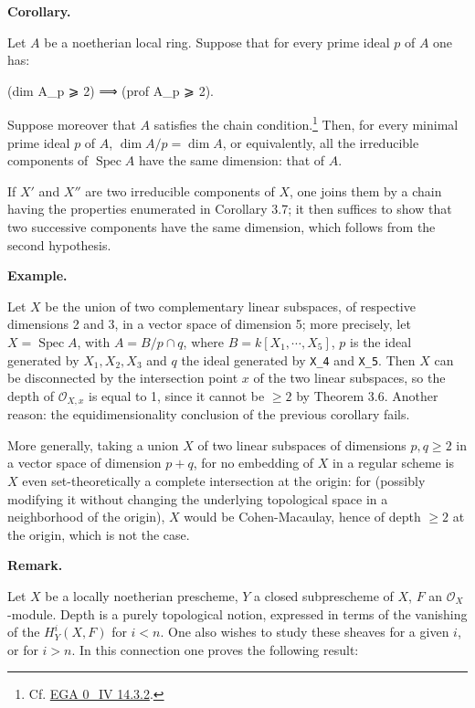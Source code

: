 \documentclass[
  11pt,
  a4paper,
]{book}
\newenvironment{Shaded}{}{}
\newcommand{\NormalTok}[1]{#1}
\begin{document}
\textbf{Corollary.}

Let \(A\) be a noetherian local ring. Suppose that for every prime ideal
\(p\) of \(A\) one has:

\begin{Shaded}
\begin{Highlighting}[]
\NormalTok{(dim A\_p ⩾ 2) ⟹ (prof A\_p ⩾ 2).}
\end{Highlighting}
\end{Shaded}

Suppose moreover that \(A\) satisfies the chain condition.\footnote{Cf.
  \href{https://jcreinhold.github.io/ega/iv/01-ch0-14-combinatorial-dimension.html\#143-the-chain-condition}{EGA
  0\_IV 14.3.2}.} Then, for every minimal prime ideal \(p\) of \(A\),
\(\dim
A/p = \dim A\), or equivalently, all the irreducible components of
\(\operatorname{Spec} A\) have the same dimension: that of \(A\).

If \(X'\) and \(X''\) are two irreducible components of \(X\), one joins
them by a chain having the properties enumerated in Corollary 3.7; it
then suffices to show that two successive components have the same
dimension, which follows from the second hypothesis.

\textbf{Example.}

Let \(X\) be the union of two complementary linear subspaces, of
respective dimensions 2 and 3, in a vector space of dimension 5; more
precisely, let \(X = \operatorname{Spec} A\), with \(A = B/p \cap q\),
where \(B = k[X_{1}, \cdots,
X_{5}]\), \(p\) is the ideal generated by \(X_{1}, X_{2}, X_{3}\) and
\(q\) the ideal generated by \texttt{X\_4} and \texttt{X\_5}. Then \(X\)
can be disconnected by the intersection point \(x\) of the two linear
subspaces, so the depth of \(\mathcal{O}_{X,x}\) is equal to 1, since it
cannot be \(\geqslant 2\) by Theorem 3.6. Another reason: the
equidimensionality conclusion of the previous corollary fails.

More generally, taking a union \(X\) of two linear subspaces of
dimensions \(p, q \geqslant 2\) in a vector space of dimension
\(p + q\), for no embedding of \(X\) in a regular scheme is \(X\) even
set-theoretically a complete intersection at the origin: for (possibly
modifying it without changing the underlying topological space in a
neighborhood of the origin), \(X\) would be Cohen-Macaulay, hence of
depth \(\geqslant 2\) at the origin, which is not the case.

\textbf{Remark.}

Let \(X\) be a locally noetherian prescheme, \(Y\) a closed subprescheme
of \(X\), \(F\) an \(\mathcal{O}_{X}\)-module. Depth is a purely
topological notion, expressed in terms of the vanishing of the
\(H^{i}_{Y}(X, F)\) for \(i < n\). One also wishes to study these
sheaves for a given \(i\), or for \(i > n\). In this connection one
proves the following result:
\end{document}
